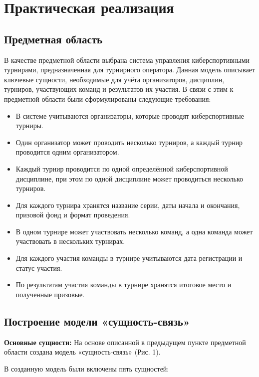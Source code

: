 \documentclass[a4paper, 14pt]{extarticle}
\begin{document}
\section{Практическая реализация}

\subsection{Предметная область}

В качестве предметной области выбрана система управления киберспортивными турнирами, предназначенная для турнирного оператора. Данная модель описывает ключевые сущности, необходимые для учёта организаторов, дисциплин, турниров, участвующих команд и результатов их участия. В связи с этим к предметной области были сформулированы следующие требования:

\begin{itemize}
  \item В системе учитываются организаторы, которые проводят киберспортивные турниры.
  \item Один организатор может проводить несколько турниров, а каждый турнир проводится одним организатором.
  \item Каждый турнир проводится по одной определённой киберспортивной дисциплине, при этом по одной дисциплине может проводиться несколько турниров.
  \item Для каждого турнира хранятся название серии, даты начала и окончания, призовой фонд и формат проведения.
  \item В одном турнире может участвовать несколько команд, а одна команда может участвовать в нескольких турнирах.
  \item Для каждого участия команды в турнире учитываются дата регистрации и статус участия.
  \item По результатам участия команды в турнире хранятся итоговое место и полученные призовые.
\end{itemize}

\subsection{Построение модели «сущность-связь»}

\textbf{Основные сущности:} На основе описанной в предыдущем пункте предметной области создана модель «сущность-связь» (Рис. 1).

В созданную модель были включены пять сущностей:
\end{document}
